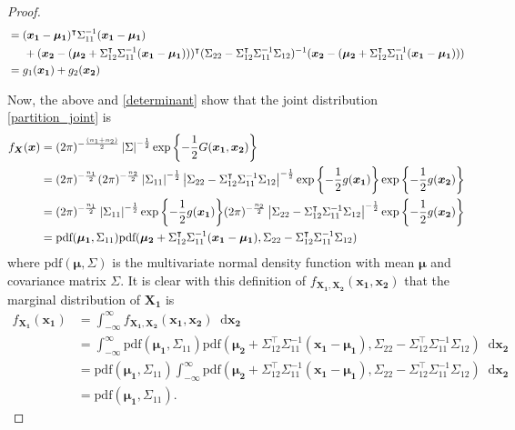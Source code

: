 \documentclass[12pt]{article}
\theoremstyle{definition}
\newcommand{\pdf}{\text{pdf}}
\newcommand*\diff{\mathop{}\!\mathrm{d}}
\newcommand{\vect}[1]{\boldsymbol{#1}}
\begin{document}
\begin{proof}
\begin{align}
     &= (\vect{x_1} - \vect{\mu_1})^\intercal \Sigma_{11}^{-1} (\vect{x_1} - \vect{\mu_1}) \notag \\ & \hspace{5mm} + (\vect{x_2} - (\vect{\mu_2} + \Sigma_{12}^\intercal\Sigma_{11}^{-1}(\vect{x_1} - \vect{\mu_1})) )^\intercal (\Sigma_{22} - \Sigma_{12}^\intercal\Sigma_{11}^{-1}\Sigma_{12})^{-1} (\vect{x_2} - (\vect{\mu_2} + \Sigma_{12}^\intercal\Sigma_{11}^{-1}(\vect{x_1} - \vect{\mu_1})) ) \notag \\
     &= g_1(\vect{x_1}) + g_2(\vect{x_2})
   \end{align}

   Now, the above and \eqref{determinant} show that the joint distribution
   \eqref{partition_joint} is
   \begin{align}
     f_{\vect{X}}(\vect{x})
     &= (2\pi) ^ {-\frac{(n_1 + n_2)}{2}} \left| \Sigma  \right|^{-\frac{1}{2}} \exp{\left\{-\frac{1}{2} G(\vect{x_1}, \vect{x_2})\right\}} \notag \\
     &= (2\pi) ^ {-\frac{n_1}{2}} (2\pi) ^ {-\frac{n_2}{2}} \left| \Sigma_{11} \right| ^ {-\frac{1}{2}} \left| \Sigma_{22} - \Sigma_{12}^\intercal \Sigma_{11}^{-1} \Sigma_{12}\right| ^ {-\frac{1}{2}} \exp{\left\{-\frac{1}{2}g(\vect{x_1})\right\}}\exp{\left\{-\frac{1}{2}g(\vect{x_2})\right\}} \notag \\
     &= (2\pi) ^ {-\frac{n_1}{2}} \left| \Sigma_{11} \right| ^ {-\frac{1}{2}} \exp{\left\{-\frac{1}{2}g(\vect{x_1})\right\}} (2\pi) ^ {-\frac{n_2}{2}} \left| \Sigma_{22} - \Sigma_{12}^\intercal \Sigma_{11}^{-1} \Sigma_{12}\right| ^ {-\frac{1}{2}} \exp{\left\{-\frac{1}{2}g(\vect{x_2})\right\}} \notag \\
     &= \pdf(\vect{\mu_1}, \Sigma_{11}) \pdf(\vect{\mu_2} + \Sigma_{12}^\intercal\Sigma_{11}^{-1}(\vect{x_1} - \vect{\mu_1}), \Sigma_{22} - \Sigma_{12}^\intercal \Sigma_{11}^{-1} \Sigma_{12})
   \end{align}
   where $\pdf(\vect{\mu}, \Sigma)$ is the multivariate normal density function
   with mean $\vect{\mu}$ and covariance matrix $\Sigma$. It is clear with this
   definition of $f_{\vect{X_1}, \vect{X_2}}(\vect{x_1}, \vect{x_2})$ that
   the marginal distribution of $\vect{X_1}$ is
   \begin{align*}
     f_{\vect{X_1}}(\vect{x_1})
     &= \int_{-\infty}^\infty f_{\vect{X_1}, \vect{X_2}}(\vect{x_1}, \vect{x_2}) \diff \vect{x_2} \\
     &= \int_{-\infty}^\infty \pdf(\vect{\mu_1}, \Sigma_{11}) \pdf(\vect{\mu_2} + \Sigma_{12}^\intercal\Sigma_{11}^{-1}(\vect{x_1} - \vect{\mu_1}), \Sigma_{22} - \Sigma_{12}^\intercal \Sigma_{11}^{-1} \Sigma_{12}) \diff \vect{x_2} \\
     &= \pdf(\vect{\mu_1}, \Sigma_{11}) \int_{-\infty}^\infty \pdf(\vect{\mu_2} + \Sigma_{12}^\intercal\Sigma_{11}^{-1}(\vect{x_1} - \vect{\mu_1}), \Sigma_{22} - \Sigma_{12}^\intercal \Sigma_{11}^{-1} \Sigma_{12}) \diff \vect{x_2} \\
     &= \pdf(\vect{\mu_1}, \Sigma_{11}).
   \end{align*}


\end{proof}
\end{document}

